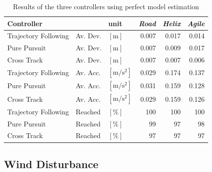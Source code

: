 \begin{table}[h]
\begin{center}
 \begin{tabular}{lll|rrr}
 \hline
 Controller &   & unit & \textit{Road} & \textit{Helix} & \textit{Agile} \\ \hline \hline
 Trajectory Following & Av. Dev. & $[\si{\meter}]$ & 0.007 & 0.017 & 0.014 \\
 Pure Pursuit         & Av. Dev. & $[\si{\meter}]$ & 0.007 & 0.009 & 0.017 \\
 Cross Track          & Av. Dev. & $[\si{\meter}]$ &  0.007 & 0.007 & 0.006 \\
    
 Trajectory Following & Av. Acc. & $[\si{\meter\per\square\second}]$ & 0.029 & 0.174 & 0.137 \\
 Pure Pursuit         & Av. Acc. & $[\si{\meter\per\square\second}]$ & 0.031 & 0.159 & 0.128 \\
 Cross Track          & Av. Acc. & $[\si{\meter\per\square\second}]$ & 0.029 & 0.159 & 0.126 \\
 
 Trajectory Following & Reached & $[\si{\percent}]$ & 100 & 100 & 100 \\
 Pure Pursuit         & Reached & $[\si{\percent}]$ &  99 &  97 &  98 \\
 Cross Track          & Reached & $[\si{\percent}]$ &  97 &  97 &  97 \\
 \hline
 \end{tabular}
 \caption{Results of the three controllers using perfect model estimation}\vspace{1ex}
 \label{tab:results_perfect_model}
\end{center}
\end{table}


\subsection{Wind Disturbance}
\label{sub:results_wind_disturbance}

